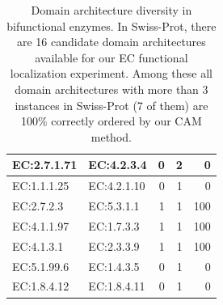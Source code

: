 \begin{table}[htbp]
\begin{tabular}{|l|l|r|r|r|}
\hline
EC:2.7.1.71  & EC:4.2.3.4    & 0                                            & 2                                        & 0                                   \\
\hline
EC:1.1.1.25  & EC:4.2.1.10   & 0                                            & 1                                        & 0                                   \\
\hline
EC:2.7.2.3   & EC:5.3.1.1    & 1                                            & 1                                        & 100                                 \\
\hline
EC:4.1.1.97  & EC:1.7.3.3    & 1                                            & 1                                        & 100                                 \\
\hline
EC:4.1.3.1   & EC:2.3.3.9    & 1                                            & 1                                        & 100                                 \\
\hline
EC:5.1.99.6  & EC:1.4.3.5    & 0                                            & 1                                        & 0                                  \\
\hline
EC:1.8.4.12  & EC:1.8.4.11   & 0                                            & 1                                        & 0                                   \\
\hline
\end{tabular}
\caption{Domain architecture diversity in bifunctional enzymes. In Swiss-Prot, there are 16 candidate domain architectures available for our EC functional localization experiment. Among these all domain architectures with more than 3 instances in Swiss-Prot (7 of them) are 100\% correctly ordered by our CAM method.}
\end{table}

\pagebreak
